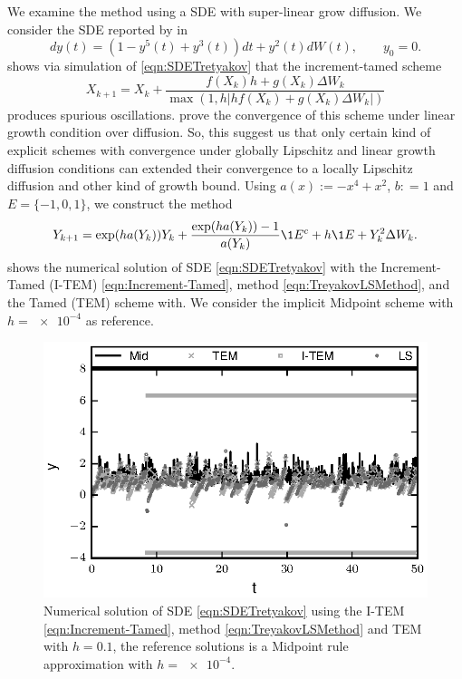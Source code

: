 \begin{example} We examine the \SM method using a SDE with super-linear grow diffusion. We 
	consider the SDE reported by \citeauthor*{Tretyakov2013} in \cite[Eq. (5.6)]{Tretyakov2013}
	\begin{equation}\label{eqn:SDETretyakov}
		dy(t) =
		\left(
			1-y^5(t) +y^3(t)  
		\right) dt
		+
		y^2(t) dW(t), \qquad y_0=0.
	\end{equation}
	\citeauthor{Tretyakov2013} shows via simulation of \eqref{eqn:SDETretyakov} that the increment-tamed scheme
	\cite[Eq(1.5)]{Hutzenthaler2015}
	\begin{equation}\label{eqn:Increment-Tamed}
		X_{k+1} = X_k + 
		\frac{
			f(X_k) h + 
			g(X_k)\Delta W_k 
		}{
		\max\left(
		1, h
		\left|
		h f(X_k) +
		g(X_k)\Delta W_k
		\right|
	\right)}
	\end{equation}
	produces spurious oscillations. \citeauthor{Hutzenthaler2015} prove the convergence of this scheme under
	linear growth condition over diffusion. So, this suggest us that only certain kind of 
	explicit schemes with convergence under globally Lipschitz and linear growth diffusion conditions	
	can extended their convergence to a locally Lipschitz diffusion and other kind of growth bound.
	Using $a(x):= -x^4 +x^2$, $b: = 1$ and $E=\{-1,0,1\}$, we construct the \SM method
	\begin{equation}\label{eqn:TreyakovLSMethod}
		Y_{k+1} = \exp(ha(Y_k))Y_k + 
		\frac{\exp(ha(Y_k)) - 1}{a(Y_k)} \1{E^c}
		+h\1{E}
		+Y_k^2\Delta W_k. 		
	\end{equation}
	 shows the numerical solution of SDE \eqref{eqn:SDETretyakov} with the Increment-Tamed (I-TEM) 
	\eqref{eqn:Increment-Tamed}, \SM method \eqref{eqn:TreyakovLSMethod}, and the Tamed (TEM) scheme with. 
	We consider the implicit Midpoint scheme \cite[Eq.(5.3)]{Tretyakov2013} with $h=\num{e-4}$ 	as reference.
	\begin{figure}[h!]
		\centering
		\includegraphics{./papers/paperB/figures/Tretyakov}
		\caption{
			Numerical solution of SDE \eqref{eqn:SDETretyakov} using the I-TEM 
			\eqref{eqn:Increment-Tamed}, \SM method \eqref{eqn:TreyakovLSMethod}  and TEM
			with $h=\num{0.1}$, the reference solutions is a Midpoint rule approximation with $h=\num{e-4}$.
		}
		\label{fig:Tretyakov}
	\end{figure}
\end{example}

